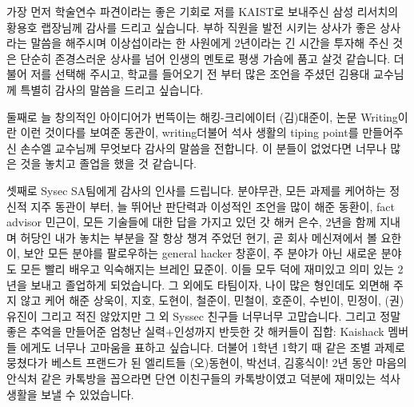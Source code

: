 \documentclass[master,english,final,pdfdoc]{kaist-ucs-improved}
\begin{document}
		
		
		
		
		
		
		
		




{\footnotesize
	
}


\iffinal
	\acknowledgment[4]
	가장 먼저 학술연수 파견이라는 좋은 기회로 저를 KAIST로 보내주신 삼성 리서치의 황용호 랩장님께 감사를 드리고 싶습니다. 부하 직원을 발전 시키는 상사가 좋은 상사라는 말씀을 해주시며 이상섭이라는 한 사원에게 2년이라는 긴 시간을 투자해 주신 것은 단순히 존경스러운 상사를 넘어 인생의 멘토로 평생 가슴에 품고 살것 같습니다. 
	더불어 저를 선택해 주시고, 학교를 들어오기 전 부터 많은 조언을 주셨던 김용대 교수님께 특별히 감사의 말씀을 드리고 싶습니다. 
	
	둘째로 늘 창의적인 아이디어가 번뜩이는 해킹-크리에이터 (김)대준이, 논문 Writing이란 이런 것이다를 보여준 동관이, writing더불어 석사 생활의 tiping point를 만들어주신 손수엘 교수님께 무엇보다 감사의 말씀을 전합니다. 이 분들이 없었다면 너무나 많은 것을 놓치고 졸업을 했을 것 같습니다. 

	셋째로 Sysec SA팀에게 감사의 인사를 드립니다. 분야무관, 모든 과제를 케어하는 정신적 지주 동관이 부터, 늘 뛰어난 판단력과 이성적인 조언을 많이 해준 동환이, fact advisor 민근이, 모든 기술들에 대한 답을 가지고 있던 갓 해커 은수, 2년을 함께 지내며 허당인 내가 놓치는 부분을 잘 항상 챙겨 주었던 현기, 곧 회사 메신져에서 볼 요한이, 보안 모든 분야를 팔로우하는 general hacker 창훈이, 주 분야가 아닌 새로운 분야도 모든 빨리 배우고 익숙해지는 브레인 묘준이. 이들 모두 덕에 재미있고 의미 있는 2년을 보내고 졸업하게 되었습니다. 
	그 외에도 타팀이자, 나이 많은 형인데도 외면해 주지 않고 케어 해준 상욱이, 지호, 도현이, 철준이, 민철이, 호준이, 수빈이, 민정이, (권)유진이 그리고 적진 않았지만 그 외 Syssec 친구들 너무너무 고맙습니다.
	그리고 정말 좋은 추억을 만들어준 엄청난 실력+인성까지 반듯한 갓 해커들이 집합: Kaishack 멤버들 에게도 너무나 고마움을 표하고 싶습니다.
	더불어 1학년 1학기 때 같은 조별 과제로 뭉쳤다가 베스트 프랜드가 된 엘리트들 (오)동현이, 박선녀, 김홍식이! 2년 동안 마음의 안식처 같은 카톡방을 꼽으라면 단연 이친구들의 카톡방이였고 덕분에 재미있는 석사 생활을 보낼 수 있었습니다.
\end{document}
